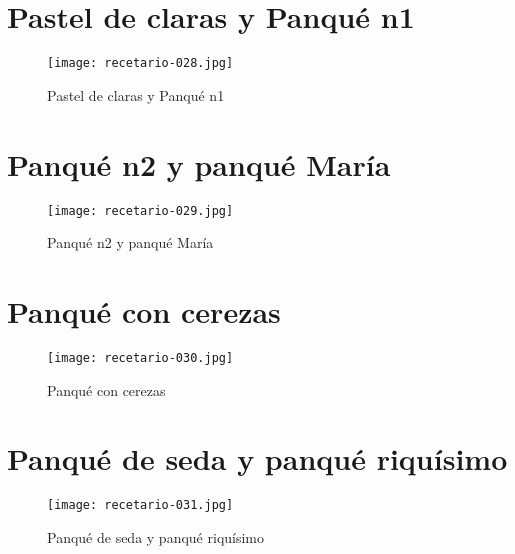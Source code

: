 \documentclass[12pt,letterpaper]{article}
\begin{document}
\newpage

  \section{Pastel de claras y Panqué n1}
  
    \begin{figure}[H]
      \vspace{2pt}
    \texttt{[image: recetario-028.jpg]}
      \caption{Pastel de claras y Panqué n1}
      
    \end{figure}

\newpage

  \section{Panqué n2 y panqué María}
  
    \begin{figure}[H]
      \vspace{2pt}
    \texttt{[image: recetario-029.jpg]}
      \caption{Panqué n2 y panqué María}
      
    \end{figure}

\newpage

  \section{Panqué con cerezas}
  
    \begin{figure}[H]
      \vspace{2pt}
    \texttt{[image: recetario-030.jpg]}
      \caption{Panqué con cerezas}
      
    \end{figure}

\newpage

  \section{Panqué de seda y panqué riquísimo}
  
    \begin{figure}[H]
      \vspace{2pt}
    \texttt{[image: recetario-031.jpg]}
      \caption{Panqué de seda y panqué riquísimo}
      
    \end{figure}
\end{document}
